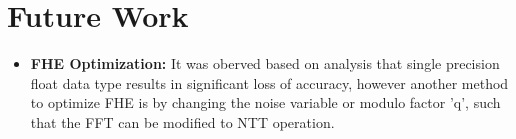\section{Future Work}
\begin{itemize}
\item \textbf{FHE Optimization:} It was oberved based on analysis that single precision float data type results in significant loss of accuracy, however another method to optimize FHE is by changing the noise variable or modulo factor 'q', such that the FFT can be modified to NTT operation. 

\end{itemize}



